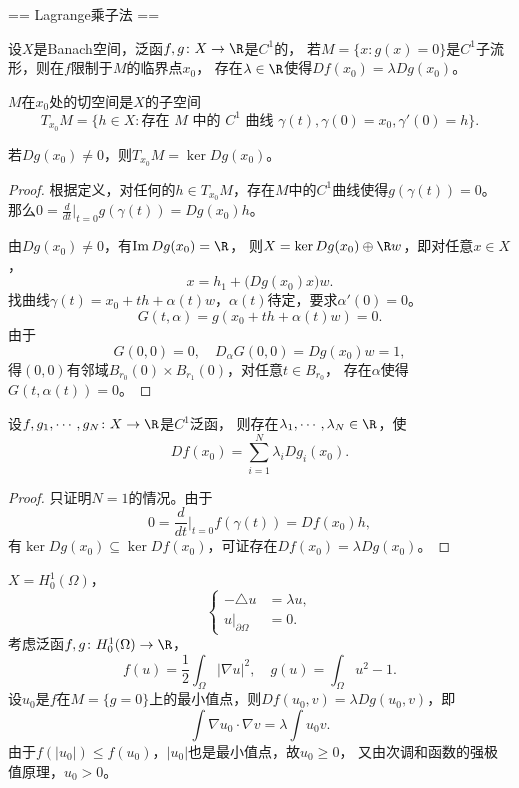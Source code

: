 == Lagrange乘子法 ==

\begin{theorem}
    设$X$是Banach空间，泛函$f,g\colon X\to\R$是$C^1$的，
    若$M=\{x:g(x)=0\}$是$C^1$子流形，则在$f$限制于$M$的临界点$x_0$，
    存在$\lambda\in\R$使得$Df(x_0)=\lambda Dg(x_0)$。
\end{theorem}
\begin{definition}[切空间]
    $M$在$x_0$处的切空间是$X$的子空间
    \[T_{x_0}M=\{h\in X:\text{存在 }M\text{ 中的 }C^1\text{ 曲线 }\gamma(t),
    \gamma(0)=x_0,\gamma'(0)=h\}.\]
\end{definition}
\begin{proposition}
    若$Dg(x_0)\ne0$，则$T_{x_0}M=\ker Dg(x_0)$。
\end{proposition}
\begin{proof}
    根据定义，对任何的$h\in T_{x_0}M$，存在$M$中的$C^1$曲线使得$g(\gamma(t))=0$。
    那么$0=\frac{d}{dt}\big|_{t=0}g(\gamma(t))=Dg(x_0)h$。

    由$Dg(x_0)\ne0$，有$\operatorname{Im}Dg(x_0)=\R$，
    则$X=\ker Dg(x_0)\oplus\R w$，即对任意$x\in X$，
    \[x=h_1+\big(Dg(x_0)x\big)w.\]
    找曲线$\gamma(t)=x_0+th+\alpha(t)w$，$\alpha(t)$待定，要求$\alpha'(0)=0$。
    \[G(t,\alpha)=g(x_0+th+\alpha(t)w)=0.\]
    由于
    \[G(0,0)=0,\quad D_\alpha G(0,0)=Dg(x_0)w=1,\]
    得$(0,0)$有邻域$B_{r_0}(0) \times B_{r_1}(0)$，对任意$t\in B_{r_0}$，
    存在$\alpha$使得$G(t,\alpha(t))=0$。
\end{proof}
\begin{theorem}
    设$f,g_1,\cdots,g_N\colon X\to\R$是$C^1$泛函，
    则存在$\lambda_1,\cdots,\lambda_N\in\R$，使
    \[Df(x_0)=\sum_{i=1}^N\lambda_iDg_i(x_0).\]
\end{theorem}
\begin{proof}
    只证明$N=1$的情况。由于
    \[0=\frac{d}{dt}\Big|_{t=0}f(\gamma(t))=Df(x_0)h,\]
    有$\ker Dg(x_0)\subseteq\ker Df(x_0)$，可证存在$Df(x_0)=\lambda Dg(x_0)$。
\end{proof}
\begin{example}
    $X=H_0^1(\Omega)$，
    \begin{equation*}
        \left\{\begin{aligned}
            -\triangle u&=\lambda u,\\
            u|_{\partial\Omega}&=0.
        \end{aligned}\right.
    \end{equation*}
    考虑泛函$f,g\colon H_0^1(\Omega)\to\R$，
    \[f(u)=\frac{1}{2}\int_\Omega|\nabla u|^2,\quad g(u)=\int_\Omega u^2-1.\]
    设$u_0$是$f$在$M=\{g=0\}$上的最小值点，则$Df(u_0,v)=\lambda Dg(u_0,v)$，即
    \[\int\nabla u_0\cdot\nabla v=\lambda\int u_0v.\]
    由于$f(|u_0|)\le f(u_0)$，$|u_0|$也是最小值点，故$u_0\ge0$，
    又由次调和函数的强极值原理，$u_0>0$。
\end{example}
